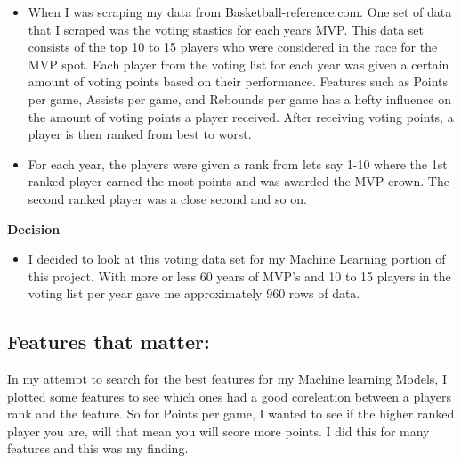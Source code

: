 \documentclass[11pt]{article}
\providecommand{\tightlist}{%
      \setlength{\itemsep}{0pt}\setlength{\parskip}{0pt}}
\begin{document}
\begin{itemize}
\item
  When I was scraping my data from Basketball-reference.com. One set of
  data that I scraped was the voting stastics for each years MVP. This
  data set consists of the top 10 to 15 players who were considered in
  the race for the MVP spot. Each player from the voting list for each
  year was given a certain amount of voting points based on their
  performance. Features such as Points per game, Assists per game, and
  Rebounds per game has a hefty influence on the amount of voting points
  a player received. After receiving voting points, a player is then
  ranked from best to worst.
\item
  For each year, the players were given a rank from lets say 1-10 where
  the 1st ranked player earned the most points and was awarded the MVP
  crown. The second ranked player was a close second and so on.
\end{itemize}

\textbf{Decision} \newline

\begin{itemize}
\tightlist
\item
  I decided to look at this voting data set for my Machine Learning
  portion of this project. With more or less 60 years of MVP's and 10 to
  15 players in the voting list per year gave me approximately 960 rows
  of data.
\end{itemize}

    \subsection{Features that matter:}\label{features-that-matter}

In my attempt to search for the best features for my Machine learning
Models, I plotted some features to see which ones had a good coreleation
between a players rank and the feature. So for Points per game, I wanted
to see if the higher ranked player you are, will that mean you will
score more points. I did this for many features and this was my finding.
\end{document}

